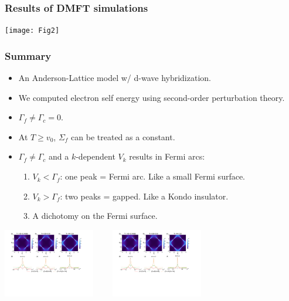 \documentclass[xcolor=table, 10pt, aspectratio=169]{beamer}
\begin{document}
\begin{frame}
	\frametitle{Results of DMFT simulations}
	\begin{center}
		\texttt{[image: Fig2]}
	\end{center}
\end{frame}
\begin{frame}
\frametitle{Summary}
\begin{itemize}
\item<1-7> An Anderson-Lattice model w/ d-wave hybridization.
\item<2-5> We computed electron self energy using second-order perturbation theory.
\item<3-8> $\Gamma_f\neq\Gamma_c=0$.
\item<4-6> At $T\geq v_0$, $\Sigma_f$ can be treated as a constant.
\item<5-9> $\Gamma_f\neq\Gamma_c$ and a $k$-dependent $V_k$ results in Fermi arcs:
\begin{enumerate}
\item $V_k<\Gamma_f$: one peak = Fermi arc. Like a small Fermi surface.
\item $V_k>\Gamma_f$: two peaks = gapped. Like a Kondo insulator.
\item A dichotomy on the Fermi surface.
\end{enumerate}
\end{itemize}
\begin{center}
	\includegraphics[height=3cm]{arc1}~~~~
	\includegraphics[height=3cm]{arc2}
\end{center}
\end{frame}


\end{document}
